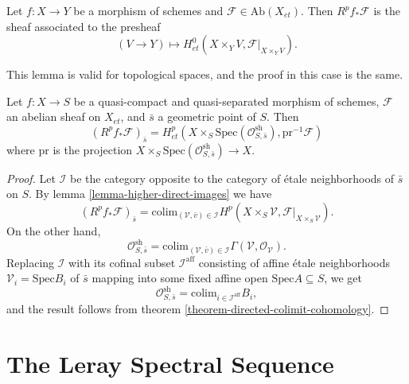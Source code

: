 \begin{lemma}
\label{lemma-higher-direct-images}
Let $f: X\to Y$ be a morphism of schemes and $\mathcal{F}\in 
\text{Ab}(X_{et})$. Then $R^pf_*\mathcal{F}$ is the sheaf associated to the 
presheaf
$$
(V\to Y)\longmapsto H_{et}^0 \left(X\times_Y V, 
\mathcal{F}|_{X\times_YV}\right).
$$
\end{lemma}

\noindent
This lemma is valid for topological spaces, and the proof in this case is the 
same.

\begin{theorem}
\label{theorem-higher-direct-images}
Let $f: X\to S$ be a quasi-compact and quasi-separated morphism of schemes, 
$\mathcal{F}$ an abelian sheaf on $X_{et}$, and $\bar s$ a geometric point of 
$S$. Then
$$
\left(R^pf_* \mathcal{F}\right)_{\bar s} = H_{et}^p\left( X\times_S 
\text{Spec}(\mathcal{O}_{S, \bar s}^\mathrm{sh}), 
\text{pr}^{-1}\mathcal{F}\right)
$$
where $\text{pr}$ is the projection $X\times_S \text{Spec}(\mathcal{O}_{S, 
\bar{s}}^\mathrm{sh}) \to X$.
\end{theorem}

\begin{proof}
Let $\mathcal{I}$ be the category opposite to the category of \'etale 
neighborhoods of $\bar s$ on $S$. By lemma \ref{lemma-higher-direct-images} 
we have
$$
\left(R^pf_*\mathcal{F}\right)_{\bar{s}} = \text{colim}_{(\mathcal{V}, 
\bar{v})\in \mathcal{I}} H^p(X\times_S\mathcal{V}, 
\mathcal{F}|_{X\times_S\mathcal{V}}).
$$
On the other hand, 
$$
\mathcal{O}_{S, \bar{s}}^\mathrm{sh} = \text{colim}_{(\mathcal{V}, \bar v)\in 
\mathcal{I}} \Gamma(\mathcal{V}, \mathcal{O}_\mathcal{V}).
$$
Replacing $\mathcal{I}$ with its cofinal subset $\mathcal{I}^\mathrm{aff}$ 
consisting of affine \'etale neighborhoods $\mathcal{V}_i= \text{Spec} B_i$ of 
$\bar s$ mapping into some fixed affine open $\text{Spec} A \subseteq S$, we get
$$
\mathcal{O}_{S, \bar{s}}^\mathrm{sh} = \text{colim}_{i\in 
\mathcal{I}^\mathrm{aff}} B_i,
$$
and the result follows from theorem \ref{theorem-directed-colimit-cohomology}.
\end{proof}





\section{The Leray Spectral Sequence}
\label{section-leray}

